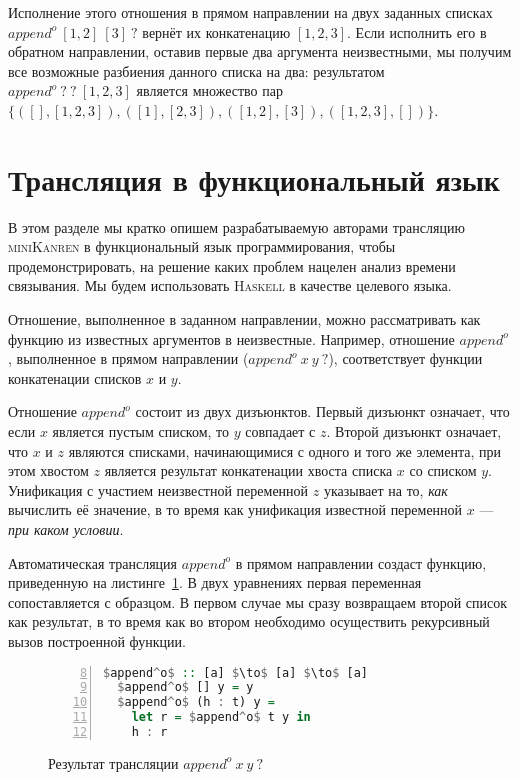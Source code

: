 \documentclass[conference,a4paper,american,russian]{IEEEtran}
\newcommand{\miniKanren}{\textsc{miniKanren}}
\newcommand{\haskell}{\textsc{Haskell}}
\begin{document}
Исполнение этого отношения в прямом направлении на двух заданных списках $append^o \ [1,2] \ [3] \ ?$ вернёт их конкатенацию $[1,2,3]$.
Если исполнить его в обратном направлении, оставив первые два аргумента неизвестными, мы получим все возможные разбиения данного списка на два: результатом $append^o \ ? \ ? \ [1,2,3]$ является множество пар $\{([],[1,2,3]), ([1], [2,3]), ([1,2], [3]), ([1,2,3], [])\}$.

\section{Трансляция в функциональный язык}\label{translator}

В этом разделе мы кратко опишем разрабатываемую авторами трансляцию \miniKanren{} в функциональный язык программирования, чтобы продемонстрировать, на решение каких проблем нацелен анализ времени связывания.
Мы будем использовать \haskell{} в качестве целевого языка. 

Отношение, выполненное в заданном направлении, можно рассматривать как функцию из известных аргументов в неизвестные. 
Например, отношение $append^o$, выполненное в прямом направлении ($append^o \ x \ y \ ?$), соответствует функции конкатенации списков $x$ и $y$. 

Отношение $append^o$ состоит из двух дизъюнктов. 
Первый дизъюнкт означает, что если $x$ является пустым списком, то $y$ совпадает с $z$. 
Второй дизъюнкт означает, что $x$ и $z$ являются списками, начинающимися с одного и того же элемента, при этом хвостом $z$ является результат конкатенации хвоста списка $x$ со списком $y$. 
Унификация с участием неизвестной переменной $z$ указывает на то, \emph{как} вычислить её значение, в то время как унификация  известной переменной $x$ --- \emph{при каком условии}.

Автоматическая трансляция $append^o$ в прямом направлении создаст функцию, приведенную на листинге~\ref{lst:appendoFWD}. 
В двух уравнениях первая переменная сопоставляется с образцом. 
В первом случае мы сразу возвращаем второй список как результат, в то время как во втором необходимо осуществить рекурсивный вызов построенной функции. 

\begin{figure}[h!]
  \begin{center}
  \begin{minipage}{0.35\textwidth}
  \begin{lstlisting}[language=Haskell, frame=single, numbers=left,numberstyle=\small, firstnumber=8, escapechar=|]
  $append^o$ :: [a] $\to$ [a] $\to$ [a]
  $append^o$ [] y = y
  $append^o$ (h : t) y =
    let r = $append^o$ t y in 
    h : r 
  \end{lstlisting}
  \end{minipage}
  \end{center}
  \caption{Результат трансляции $append^o \ x \ y \ ?$}
  \label{lst:appendoFWD}
\end{figure}
\end{document}
